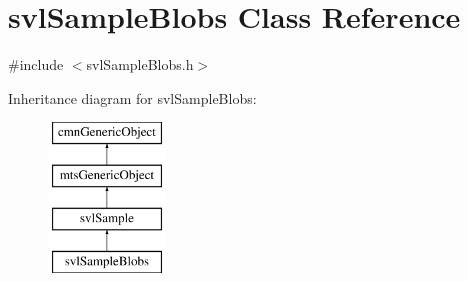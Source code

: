 \hypertarget{classsvl_sample_blobs}{\section{svl\-Sample\-Blobs Class Reference}
\label{classsvl_sample_blobs}
}


{\ttfamily \#include $<$svl\-Sample\-Blobs.\-h$>$}

Inheritance diagram for svl\-Sample\-Blobs\-:\begin{figure}[H]
\begin{center}
\leavevmode
\includegraphics[height=4.000000cm]{d4/dda/classsvl_sample_blobs}
\end{center}
\end{figure}
